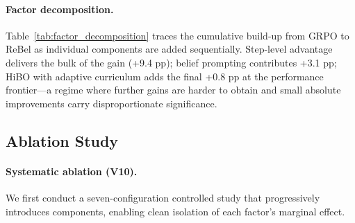 \paragraph{Factor decomposition.}
Table~\ref{tab:factor_decomposition} traces the cumulative build-up from GRPO to
ReBel as individual components are added sequentially.
Step-level advantage delivers the bulk of the gain (+9.4 pp); belief prompting
contributes +3.1 pp; HiBO with adaptive curriculum adds the final +0.8 pp at
the performance frontier---a regime where further gains are harder to obtain and
small absolute improvements carry disproportionate significance.


\subsection{Ablation Study}
\label{sec:ablation}

\paragraph{Systematic ablation (V10).}
We first conduct a seven-configuration controlled study that progressively introduces
components, enabling clean isolation of each factor's marginal effect.

